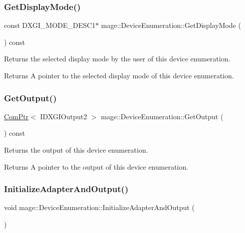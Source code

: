 \subsubsection{\texorpdfstring{Get\+Display\+Mode()}{GetDisplayMode()}}
{\footnotesize\ttfamily const D\+X\+G\+I\+\_\+\+M\+O\+D\+E\+\_\+\+D\+E\+S\+C1$\ast$ mage\+::\+Device\+Enumeration\+::\+Get\+Display\+Mode (\begin{DoxyParamCaption}{ }\end{DoxyParamCaption}) const}

Returns the selected display mode by the user of this device enumeration.

\begin{DoxyReturn}{Returns}
A pointer to the selected display mode of this device enumeration. 
\end{DoxyReturn}
\hypertarget{classmage_1_1_device_enumeration_ac3958dd53d2fdb8ff645d8dca6dc5fdd}{}\label{classmage_1_1_device_enumeration_ac3958dd53d2fdb8ff645d8dca6dc5fdd} 
\subsubsection{\texorpdfstring{Get\+Output()}{GetOutput()}}
{\footnotesize\ttfamily \hyperlink{namespacemage_ae74f374780900893caa5555d1031fd79}{Com\+Ptr}$<$ I\+D\+X\+G\+I\+Output2 $>$ mage\+::\+Device\+Enumeration\+::\+Get\+Output (\begin{DoxyParamCaption}{ }\end{DoxyParamCaption}) const}

Returns the output of this device enumeration.

\begin{DoxyReturn}{Returns}
A pointer to the output of this device enumeration. 
\end{DoxyReturn}
\hypertarget{classmage_1_1_device_enumeration_acbedeeb225585dc240f8f5be83ac5989}{}\label{classmage_1_1_device_enumeration_acbedeeb225585dc240f8f5be83ac5989} 
\subsubsection{\texorpdfstring{Initialize\+Adapter\+And\+Output()}{InitializeAdapterAndOutput()}}
{\footnotesize\ttfamily void mage\+::\+Device\+Enumeration\+::\+Initialize\+Adapter\+And\+Output (\begin{DoxyParamCaption}{ }\end{DoxyParamCaption})\hspace{0.3cm}{\ttfamily [private]}}

